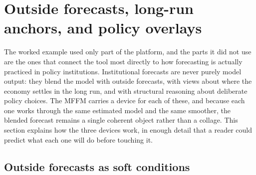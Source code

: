 \documentclass[11pt]{article}
\begin{document}
\section{Outside forecasts, long-run anchors, and policy overlays}\label{sec:toolkit}

The worked example used only part of the platform, and the parts it did not use are the ones
that connect the tool most directly to how forecasting is actually practiced in policy
institutions. Institutional forecasts are never purely model output: they blend the model
with outside forecasts, with views about where the economy settles in the long run, and with
structural reasoning about deliberate policy choices. The MFFM carries a device for each of
these, and because each one works through the same estimated model and the same smoother,
the blended forecast remains a single coherent object rather than a collage. This section
explains how the three devices work, in enough detail that a reader could predict what each
one will do before touching it.

\subsection{Outside forecasts as soft conditions}\label{sec:soft}
\end{document}
